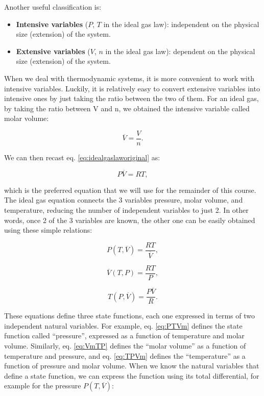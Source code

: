 \documentclass[
  9pt,
]{extbook}
\providecommand{\tightlist}{%
  \setlength{\itemsep}{0pt}\setlength{\parskip}{0pt}}
\theoremstyle{definition}
\theoremstyle{definition}
\theoremstyle{definition}
\theoremstyle{remark}
\begin{document}
Another useful classification is:

\begin{itemize}
\tightlist
\item
  \textbf{Intensive variables} (\(P\), \(T\) in the ideal gas law): independent on the physical size (extension) of the system.
\item
  \textbf{Extensive variables} (\(V\), \(n\) in the ideal gas law): dependent on the physical size (extension) of the system.
\end{itemize}

When we deal with thermodynamic systems, it is more convenient to work with intensive variables. Luckily, it is relatively easy to convert extensive variables into intensive ones by just taking the ratio between the two of them. For an ideal gas, by taking the ratio between V and n, we obtained the intensive variable called molar volume:

\begin{equation}
  \overline{V}=\frac{V}{n}.   
  \label{eq:Vmdef}
\end{equation}

We can then recast eq. \eqref{eq:idealgaslaworiginal} as:

\begin{equation}
  P\overline{V}=RT,
  \label{eq:idealgaslaw}
\end{equation}

which is the preferred equation that we will use for the remainder of this course.
The ideal gas equation connects the 3 variables pressure, molar volume, and temperature, reducing the number of independent variables to just 2. In other words, once 2 of the 3 variables are known, the other one can be easily obtained using these simple relations:

\begin{equation}
  P(T,\overline{V})=\frac{RT}{\overline{V}},
  \label{eq:PTVm}
\end{equation}

\begin{equation}
  \overline{V}(T,P)=\frac{RT}{P},
  \label{eq:VmTP}
 \end{equation}

\begin{equation}
  T(P,\overline{V})=\frac{P\overline{V}}{R}.
  \label{eq:TPVm}
\end{equation}

These equations define three state functions, each one expressed in terms of two independent natural variables. For example, eq. \eqref{eq:PTVm} defines the state function called ``pressure'', expressed as a function of temperature and molar volume. Similarly, eq. \eqref{eq:VmTP} defines the ``molar volume'' as a function of temperature and pressure, and eq. \eqref{eq:TPVm} defines the ``temperature'' as a function of pressure and molar volume. When we know the natural variables that define a state function, we can express the function using its total differential, for example for the pressure \(P(T, \overline{V})\):
\end{document}
